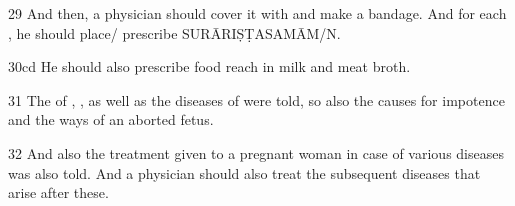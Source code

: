 \begin{translation}
\item [29] 
And then, a physician should cover it with  and make a bandage. And for each , he should place/ prescribe SURĀRIṢṬASAMĀM/N.

\item [30cd]
He should also prescribe food reach in milk and meat broth.

\item [31]
The  of , ,  as well as the diseases of  were told, so also the causes for impotence and the ways of an aborted fetus. 

\item [32] 
And also the treatment given to a pregnant woman in case of various diseases was also told. And a physician should also treat the subsequent diseases that arise after these.  

\end{translation}
